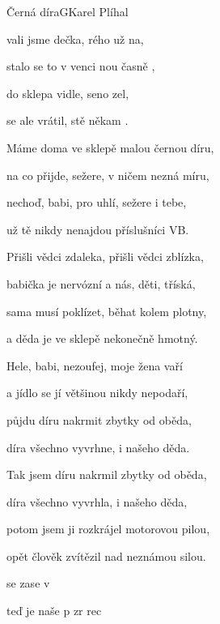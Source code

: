 \setcounter{page}{15}
\begin{song}{Černá díra}{G}{Karel Plíhal}

\begin{SBVerse}

vali jsme dečka, rého už na,

stalo se to v venci nou časně ,

 do sklepa  vidle,  seno zel,

 se ale vrátil, stě někam .

\end{SBVerse}

\begin{SBVerse}

Máme doma ve sklepě malou černou díru,

na co přijde, sežere, v ničem nezná míru,

nechoď, babi, pro uhlí, sežere i tebe,

už tě nikdy nenajdou příslušníci VB.

\end{SBVerse}

\begin{SBVerse}

Přišli vědci zdaleka, přišli vědci zblízka,

babička je nervózní a nás, děti, tříská,

sama musí poklízet, běhat kolem plotny,

a děda je ve sklepě nekonečně hmotný.

\end{SBVerse}

\begin{SBVerse}

Hele, babi, nezoufej, moje žena vaří

a jídlo se jí většinou nikdy nepodaří,

půjdu díru nakrmit zbytky od oběda,

díra všechno vyvrhne, i našeho děda.

\end{SBVerse}

\begin{SBVerse}

Tak jsem díru nakrmil zbytky od oběda,

díra všechno vyvrhla, i našeho děda,

potom jsem ji rozkrájel motorovou pilou,

opět člověk zvítězil nad neznámou silou.

\end{SBVerse}

\begin{SBVerse}

 se  zase v 

teď je naše p zr rec

\end{SBVerse}

\end{song}
\clearpage
